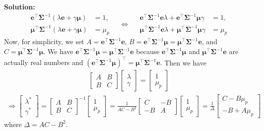 \documentclass[13pt]{article}
\theoremstyle{definition}
\newenvironment{solution}
{\color{C2}\begin{framed}\begingroup\textbf{Solution:} }
  {\endgroup\end{framed}}
\theoremstyle{remark}
\newenvironment{remark}
  {\pushQED{\qed}\renewcommand{\qedsymbol}{$\triangle$}\remarkx}
  {\popQED\endremarkx}
\begin{document}
\begin{solution}
$$
\begin{aligned}
\bm{e}^{\top}\mathbf{\Sigma}^{-1}(\lambda \bm{e}+\gamma \bm{\mu}) &=1,\\
     \bm{\mu}^{\top} \mathbf{\Sigma}^{-1}(\lambda \bm{e}+\gamma \bm{\mu}) &= \mu_p
\end{aligned} \quad \Longleftrightarrow \quad \begin{aligned}
\bm{e}^{\top}\mathbf{\Sigma}^{-1} \bm{e}\lambda+ \bm{e}^{\top}\mathbf{\Sigma}^{-1}\bm{\mu}\gamma &=1,\\
     \bm{\mu}^{\top} \mathbf{\Sigma}^{-1}\bm{e}\lambda+ \bm{\mu}^{\top} \mathbf{\Sigma}^{-1}\bm{\mu}\gamma &= \mu_p
\end{aligned}
$$
Now, for simplicity, we set $A=\bm{e}^{\top}\mathbf{\Sigma}^{-1} \bm{e}$, $B=\bm{e}^{\top}\mathbf{\Sigma}^{-1}\bm{\mu}=\bm{\mu}^{\top} \mathbf{\Sigma}^{-1}\bm{e}$, and $C=\bm{\mu}^{\top} \mathbf{\Sigma}^{-1}\bm{\mu}$.
\begin{remark}
We have $\bm{e}^{\top}\mathbf{\Sigma}^{-1}\bm{\mu}=\bm{\mu}^{\top} \mathbf{\Sigma}^{-1}\bm{e}$ because $\bm{e}^{\top}\mathbf{\Sigma}^{-1}\bm{\mu}$ and $\bm{\mu}^{\top} \mathbf{\Sigma}^{-1}\bm{e}$ are actually real numbers and $\left(\bm{e}^{\top}\mathbf{\Sigma}^{-1}\bm{\mu}\right)^\top=\bm{\mu}^{\top} \mathbf{\Sigma}^{-1}\bm{e}$.
\end{remark} 
Then we have 
\begin{align}
\begin{bmatrix}
    A & B\\
    B & C
\end{bmatrix}
\begin{bmatrix}
    \lambda\\
    \gamma
\end{bmatrix}=
\begin{bmatrix}
    1\\
    \mu_p
\end{bmatrix}\label{eq:lambda gamma MVO}
\end{align}
\begin{align}
\Longrightarrow\begin{bmatrix}
    \lambda^*\\
    \gamma^*
\end{bmatrix} = \begin{bmatrix}
    A & B\\
    B & C
\end{bmatrix}^{-1}
\begin{bmatrix}
    1\\
    \mu_p
\end{bmatrix}=\frac{1}{AC-B^2}\begin{bmatrix}
    C & -B\\
    -B & A
\end{bmatrix}\begin{bmatrix}
    1\\
    \mu_p
\end{bmatrix} = \frac{1}{\Delta}\begin{bmatrix}
    C -B\mu_p\\
    -B +A\mu_p
\end{bmatrix}\label{eq:lamda gamma values}
\end{align}
where $\Delta = AC-B^2$.


\end{solution}
\end{document}
